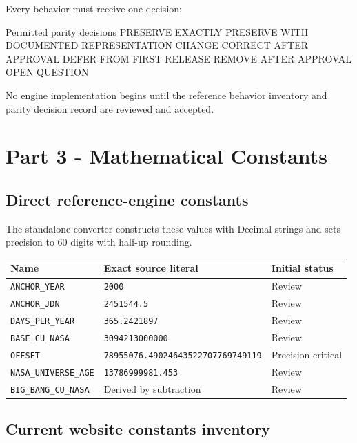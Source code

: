 \documentclass[11pt,letterpaper]{article}
\begin{document}
Every behavior must receive one decision:

\begin{codebox}{Permitted parity decisions}
PRESERVE EXACTLY
PRESERVE WITH DOCUMENTED REPRESENTATION CHANGE
CORRECT AFTER APPROVAL
DEFER FROM FIRST RELEASE
REMOVE AFTER APPROVAL
OPEN QUESTION
\end{codebox}

\begin{checkpointbox}
No engine implementation begins until the reference behavior inventory and
parity decision record are reviewed and accepted.
\end{checkpointbox}

\section{Part 3 - Mathematical Constants}

\subsection{Direct reference-engine constants}

The standalone converter constructs these values with Decimal strings and sets
precision to 60 digits with half-up rounding.

\begin{tabularx}{\textwidth}{L{1.7in}Y L{1.35in}}
\toprule
\textbf{Name} & \textbf{Exact source literal} & \textbf{Initial status} \\
\midrule
\texttt{ANCHOR\_YEAR} & \nolinkurl{2000} & Review \\
\texttt{ANCHOR\_JDN} & \nolinkurl{2451544.5} & Review \\
\texttt{DAYS\_PER\_YEAR} & \nolinkurl{365.2421897} & Review \\
\texttt{BASE\_CU\_NASA} & \nolinkurl{3094213000000} & Review \\
\texttt{OFFSET} & \nolinkurl{78955076.49024643522707769749119} & Precision critical \\
\texttt{NASA\_UNIVERSE\_AGE} & \nolinkurl{13786999981.453} & Review \\
\texttt{BIG\_BANG\_CU\_NASA} & Derived by subtraction & Review \\
\bottomrule
\end{tabularx}

\subsection{Current website constants inventory}
\end{document}
